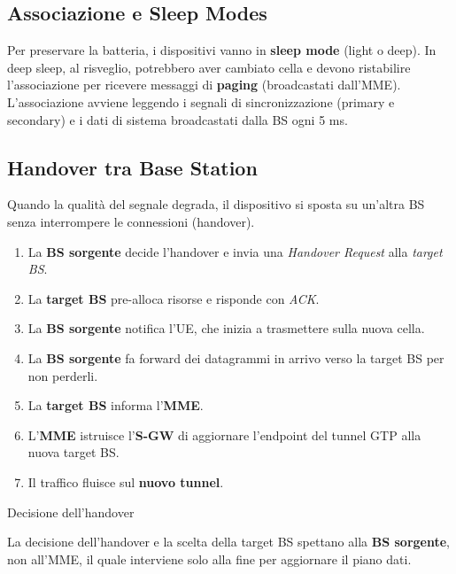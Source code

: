 \documentclass[
  italian,
  openany]{book}
\providecommand{\tightlist}{%
  \setlength{\itemsep}{0pt}\setlength{\parskip}{0pt}}
\begin{document}
\subsection{Associazione e Sleep
Modes}\label{associazione-e-sleep-modes}

Per preservare la batteria, i dispositivi vanno in \textbf{sleep mode}
(light o deep). In deep sleep, al risveglio, potrebbero aver cambiato
cella e devono ristabilire l'associazione per ricevere messaggi di
\textbf{paging} (broadcastati dall'MME). L'associazione avviene leggendo
i segnali di sincronizzazione (primary e secondary) e i dati di sistema
broadcastati dalla BS ogni 5 ms.

\subsection{Handover tra Base Station}\label{handover-tra-base-station}

Quando la qualità del segnale degrada, il dispositivo si sposta su
un'altra BS senza interrompere le connessioni (handover).

\begin{enumerate}
\def\labelenumi{\arabic{enumi}.}
\tightlist
\item
  La \textbf{BS sorgente} decide l'handover e invia una \emph{Handover
  Request} alla \emph{target BS}.
\item
  La \textbf{target BS} pre-alloca risorse e risponde con \emph{ACK}.
\item
  La \textbf{BS sorgente} notifica l'UE, che inizia a trasmettere sulla
  nuova cella.
\item
  La \textbf{BS sorgente} fa forward dei datagrammi in arrivo verso la
  target BS per non perderli.
\item
  La \textbf{target BS} informa l'\textbf{MME}.
\item
  L'\textbf{MME} istruisce l'\textbf{S-GW} di aggiornare l'endpoint del
  tunnel GTP alla nuova target BS.
\item
  Il traffico fluisce sul \textbf{nuovo tunnel}.
\end{enumerate}

\begin{callouttip}{Decisione dell’handover}

La decisione dell'handover e la scelta della target BS spettano alla
\textbf{BS sorgente}, non all'MME, il quale interviene solo alla fine
per aggiornare il piano dati.

\end{callouttip}
\end{document}

